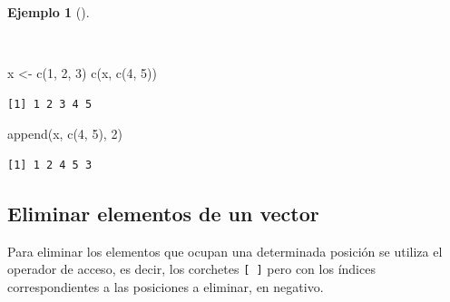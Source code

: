 \documentclass[
  spanish,
  a4paper,
]{scrreport}
\newenvironment{Shaded}{\begin{snugshade}}{\end{snugshade}}
\newcommand{\DecValTok}[1]{\textcolor[rgb]{0.68,0.00,0.00}{#1}}
\newcommand{\FunctionTok}[1]{\textcolor[rgb]{0.28,0.35,0.67}{#1}}
\newcommand{\NormalTok}[1]{\textcolor[rgb]{0.00,0.23,0.31}{#1}}
\newcommand{\OtherTok}[1]{\textcolor[rgb]{0.00,0.23,0.31}{#1}}
\theoremstyle{definition}
\theoremstyle{definition}
\newtheorem{example}{Ejemplo}[chapter]
\theoremstyle{remark}
\begin{document}
\begin{example}[]\protect\hypertarget{exm-añadir-elementos-vector}{}\label{exm-añadir-elementos-vector}

~

\begin{Shaded}
\begin{Highlighting}[]
\NormalTok{x }\OtherTok{\textless{}{-}} \FunctionTok{c}\NormalTok{(}\DecValTok{1}\NormalTok{, }\DecValTok{2}\NormalTok{, }\DecValTok{3}\NormalTok{)}
\FunctionTok{c}\NormalTok{(x, }\FunctionTok{c}\NormalTok{(}\DecValTok{4}\NormalTok{, }\DecValTok{5}\NormalTok{))}
\end{Highlighting}
\end{Shaded}

\begin{verbatim}
[1] 1 2 3 4 5
\end{verbatim}

\begin{Shaded}
\begin{Highlighting}[]
\FunctionTok{append}\NormalTok{(x, }\FunctionTok{c}\NormalTok{(}\DecValTok{4}\NormalTok{, }\DecValTok{5}\NormalTok{), }\DecValTok{2}\NormalTok{)}
\end{Highlighting}
\end{Shaded}

\begin{verbatim}
[1] 1 2 4 5 3
\end{verbatim}

\end{example}

\subsection{Eliminar elementos de un
vector}\label{eliminar-elementos-de-un-vector}

Para eliminar los elementos que ocupan una determinada posición se
utiliza el operador de acceso, es decir, los corchetes \texttt{{[}\ {]}}
pero con los índices correspondientes a las posiciones a eliminar, en
negativo.
\end{document}
